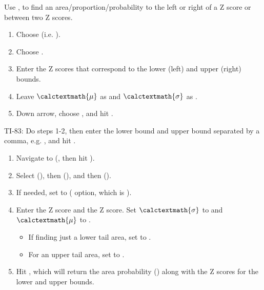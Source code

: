 
\begin{termBox}{
Use  ,  to find an area/proportion/probability to the left or right of a Z score or between two Z scores.\vspace{-1mm}
\begin{enumerate}
\setlength{\itemsep}{0mm}
\item Choose   (i.e. ).
\item Choose .
\item Enter the Z scores that correspond to the lower (left) and upper (right) bounds.
\item Leave $\calctextmath{\mu}$ as  and $\calctextmath{\sigma}$ as .
\item Down arrow, choose , and hit .\vspace{-1.5mm}
\end{enumerate}
TI-83: Do steps 1-2, then enter the lower bound and upper bound separated by a comma, e.g. , and hit .}
\end{termBox}

\begin{termBox}{
\begin{enumerate}
\setlength{\itemsep}{0mm}
\item Navigate to  (, then hit ).
\item Select  (), then  (), and then  ().
\item If needed, set  to  ( option, which is ).
\item Enter the  Z score and the  Z score. Set $\calctextmath{\sigma}$ to  and $\calctextmath{\mu}$ to .\vspace{-1.5mm}
  \begin{itemize}
  \setlength{\itemsep}{0mm}
  \item If finding just a lower tail area, set  to .
  \item For an upper tail area, set  to .
  \end{itemize}
\item Hit , which will return the area probability () along with the Z scores for the lower and upper bounds.
\end{enumerate}
}
\end{termBox}

